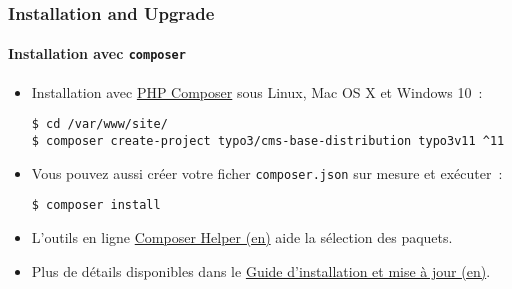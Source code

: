 %

\begin{frame}[fragile]
	\frametitle{Installation and Upgrade}
	\framesubtitle{Installation avec \texttt{composer}}


	\begin{itemize}
		\item Installation avec \href{https://getcomposer.org}{PHP Composer} sous Linux, Mac OS X et Windows 10~:
\begin{lstlisting}
$ cd /var/www/site/
$ composer create-project typo3/cms-base-distribution typo3v11 ^11
\end{lstlisting}

		\item Vous pouvez aussi créer votre ficher \texttt{composer.json} sur mesure
			et exécuter~:
\begin{lstlisting}
$ composer install
\end{lstlisting}

		\item L'outils en ligne \href{https://get.typo3.org/misc/composer/helper}{Composer Helper (en)}
			aide la sélection des paquets.

		\item Plus de détails disponibles dans le
			\href{https://docs.typo3.org/m/typo3/guide-installation/master/en-us/}{Guide d'installation et mise à jour (en)}.

	\end{itemize}
\end{frame}

